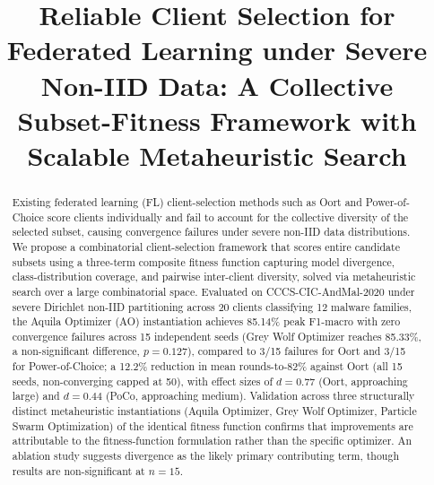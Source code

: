 \documentclass[conference]{IEEEtran}
\begin{document}
\title{Reliable Client Selection for Federated Learning under Severe Non-IID Data: A Collective Subset-Fitness Framework with Scalable Metaheuristic Search}

\author{
}

\maketitle

\begin{abstract}
Existing federated learning (FL) client-selection methods such as Oort and Power-of-Choice score clients individually and fail to account for the collective diversity of the selected subset, causing convergence failures under severe non-IID data distributions. We propose a combinatorial client-selection framework that scores entire candidate subsets using a three-term composite fitness function capturing model divergence, class-distribution coverage, and pairwise inter-client diversity, solved via metaheuristic search over a large combinatorial space. Evaluated on CCCS-CIC-AndMal-2020 under severe Dirichlet non-IID partitioning across 20 clients classifying 12 malware families, the Aquila Optimizer (AO) instantiation achieves 85.14\% peak F1-macro with zero convergence failures across 15 independent seeds (Grey Wolf Optimizer reaches 85.33\%, a non-significant difference, $p=0.127$), compared to 3/15 failures for Oort and 3/15 for Power-of-Choice; a 12.2\% reduction in mean rounds-to-82\% against Oort (all 15 seeds, non-converging capped at 50), with effect sizes of $d=0.77$ (Oort, approaching large) and $d=0.44$ (PoCo, approaching medium). Validation across three structurally distinct metaheuristic instantiations (Aquila Optimizer, Grey Wolf Optimizer, Particle Swarm Optimization) of the identical fitness function confirms that improvements are attributable to the fitness-function formulation rather than the specific optimizer. An ablation study suggests divergence as the likely primary contributing term, though results are non-significant at $n=15$.
\end{abstract}
\end{document}
